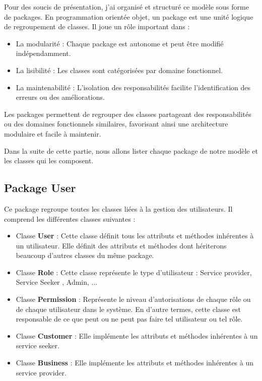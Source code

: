{Pour des soucis de présentation, j'ai organisé et structuré ce modèle sous forme de packages. En programmation orientée objet, un package est une unité logique de regroupement de classes. Il joue un rôle important dans :

\vspace{0.4cm}
\begin{itemize}
    \item La modularité : Chaque package est autonome et peut être modifié indépendamment.
    \item La lisibilité : Les classes sont catégorisées par domaine fonctionnel.
    \item La maintenabilité : L'isolation des responsabilités facilite l'identification des erreurs ou des améliorations.
\end{itemize}

\vspace{0.4cm}
Les packages permettent de regrouper des classes partageant des responsabilités ou des domaines fonctionnels similaires, favorisant ainsi une architecture modulaire et facile à maintenir. 

\vspace{0.4cm}

Dans la suite de cette partie, nous allons lister chaque package de notre modèle et les classes qui les composent. 

\subsection{Package User}
Ce package regroupe toutes les classes liées à la gestion des utilisateurs.
Il comprend les différentes classes suivantes :

\vspace{0.35cm}

\begin{itemize} 
    \item Classe \textbf{User} : Cette classe définit tous les attributs et méthodes inhérentes à un utilisateur. Elle  définit des attributs et méthodes dont hériterons beaucoup d'autres classes du même package.
    \item Classe \textbf{Role} : Cette classe représente le type d'utilisateur : Service provider, Service Seeker , Admin, ...
    \item Classe \textbf{Permission} : Représente le niveau d'autorisations de chaque rôle ou de chaque utilisateur dans le système. En d'autre termes, cette classe est responsable de ce que peut ou ne peut pas faire tel utilisateur ou tel rôle.
    \item Classe \textbf{Customer} : Elle implémente les attributs et méthodes inhérentes à un service seeker.
    \item Classe \textbf{Business} : Elle implémente les attributs et méthodes inhérentes à un service provider.


\end{itemize}}
